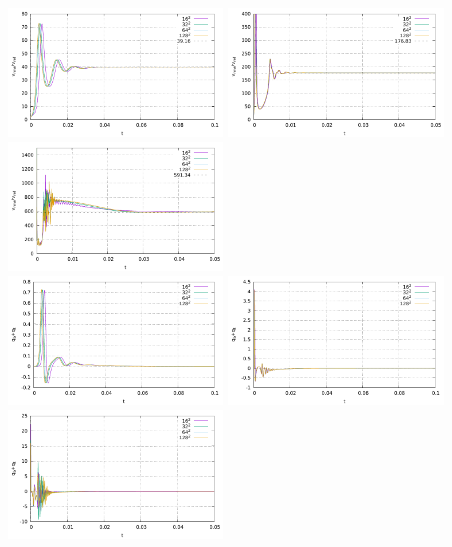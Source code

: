 \begin{center}
\includegraphics[width=5.7cm]{python_codes/fieldstone_110/results_EBA/aspect/vrms_1e4}
\includegraphics[width=5.7cm]{python_codes/fieldstone_110/results_EBA/aspect/vrms_1e5}
\includegraphics[width=5.7cm]{python_codes/fieldstone_110/results_EBA/aspect/vrms_1e6}\\
\includegraphics[width=5.7cm]{python_codes/fieldstone_110/results_EBA/aspect/qsum_1e4}
\includegraphics[width=5.7cm]{python_codes/fieldstone_110/results_EBA/aspect/qsum_1e5}
\includegraphics[width=5.7cm]{python_codes/fieldstone_110/results_EBA/aspect/qsum_1e6}\\

\end{center}
